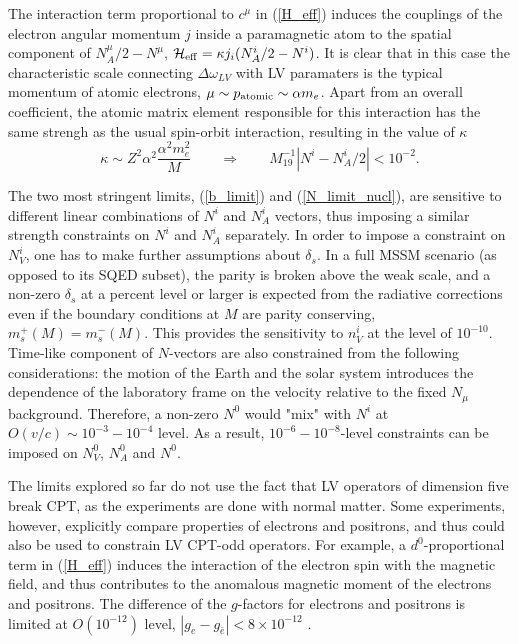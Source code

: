 \documentclass[12pt]{revtex4}
\begin{document}
The interaction term proportional to $c^\mu$ in 
(\ref{H_eff}) induces the couplings of the electron angular 
momentum $j$ inside a paramagnetic atom to the spatial component of 
$N_A^\mu/2-N^\mu$, $\mathcal{H}_{\rm eff}= \kappa j_i (N^i_A/2-N^i) $. 
It is clear that in this case the characteristic scale connecting 
$\Delta \omega_{LV}$ with LV paramaters is the typical momentum 
of atomic electrons, $\mu \sim p_{\rm atomic} \sim \alpha m_e$. 
Apart from an overall coefficient, the atomic matrix element
 responsible for this interaction has the same strengh as the usual spin-orbit 
 interaction, resulting in the value of $\kappa$
 \begin{equation}
 \kappa \sim Z^2\alpha^2 \frac{\alpha^2 m_e^2}{M}\qquad \Rightarrow \qquad
M_{19}^{-1}|N^i-N_A^i/2|<10^{-2}.
 \label{N_limit_atom}
 \end{equation}

 The two most stringent limits, (\ref{b_limit}) and (\ref{N_limit_nucl}),
are sensitive to different linear combinations of $N^i$ and $N_A^i$ vectors,
thus imposing a similar strength constraints on $N^i$ and 
$N_A^i$ separately. In order to impose a constraint on $N_V^i$, one has to 
make further assumptions about $\delta_s$. 
In a full MSSM scenario (as opposed to its SQED subset), the parity is broken above the 
weak scale, and a non-zero $\delta_s $ at a percent level or larger is expected from the 
radiative corrections even if the boundary conditions at $M$ are parity conserving, 
$m_s^+(M) = m_s^-(M)$.
This provides the sensitivity to $n_V^i$ at the level of $10^{-10}$. 
Time-like component of $N$-vectors are also constrained from the following considerations: 
the motion of the Earth and the solar system introduces the dependence of the laboratory frame 
on the velocity relative to the fixed $N_\mu$ background. 
Therefore, a non-zero $N^0$ would "mix" with 
$N^i$ at $O(v/c) \sim 10^{-3}-10^{-4}$ level. As a result, 
$10^{-6}-10^{-8}$-level constraints can be 
imposed on $N_V^0$, $N_A^0$ and $N^0$. 



The limits explored so far do not use the fact that 
LV operators of dimension five break CPT, as the 
experiments \cite{clock1,clock2} are done with normal matter.
Some experiments, however, explicitly compare properties 
of electrons and positrons, and thus could also be used 
to constrain LV CPT-odd operators. 
For example, a $ d^0 $-proportional term in (\ref{H_eff})
induces the interaction of the
electron spin with the magnetic field,
and thus contributes to the anomalous magnetic
moment of the electrons and positrons. The difference of
the $g$-factors for electrons and positrons is limited at  
$O(10^{-12})$ level, $|g_{e}-g_{\bar e}|< 8\times 10^{-12}$ 
\cite{Mittleman:1999it}.  
\end{document}
